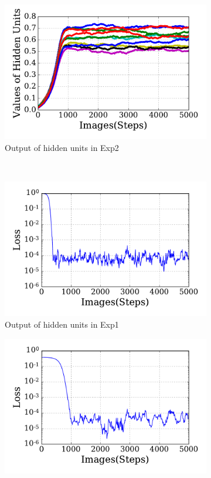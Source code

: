 \begin{figure}
\begin{subfigure}[t]{0.45\textwidth}
		\includegraphics[width=\textwidth]{pics_sdlm/30_exp_RBM/exp2_hid_non.pdf}
		\caption{Output of hidden units in Exp2}
	\end{subfigure}\\
	\begin{subfigure}[t]{0.45\textwidth}
		\includegraphics[width=\textwidth]{pics_sdlm/30_exp_RBM/exp1_loss.pdf}
		\caption{Output of hidden units in Exp1}
	\end{subfigure}
	\begin{subfigure}[t]{0.45\textwidth}
		\includegraphics[width=\textwidth]{pics_sdlm/30_exp_RBM/exp2_loss.pdf}

\end{subfigure}
\end{figure}
